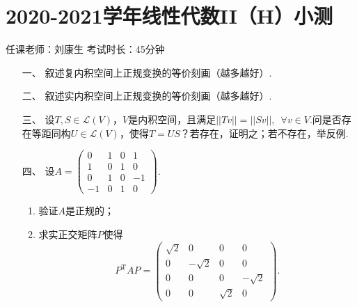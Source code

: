 \section*{2020-2021学年线性代数II（H）小测}

\begin{center}
    任课老师：刘康生\hspace{4em} 考试时长：45分钟
\end{center}

\begin{enumerate}
	\item[一、]叙述复内积空间上正规变换的等价刻画（越多越好）.
	\item[二、]叙述实内积空间上正规变换的等价刻画（越多越好）.
	\item[三、]设$T,S\in\mathcal{L}(V)$，$V$是内积空间，且满足$||Tv||=||Sv||,\enspace \forall v\in V$.问是否存在等距同构$U\in\mathcal{L}(V)$，使得$T=US$？若存在，证明之；若不存在，举反例.
	\item[四、]设$A=\begin{pmatrix}
        0 & 1 & 0 & 1 \\ 1 & 0 & 1 & 0 \\ 0 & 1 & 0 & -1 \\ -1 & 0 & 1 & 0
    \end{pmatrix}$.
    \begin{enumerate}[label=(\arabic*)]
        \item 验证$A$是正规的；
        \item 求实正交矩阵$P$使得
        \[P^{\mathrm{T}}AP=\begin{pmatrix}
            \sqrt{2} & 0 & 0 & 0 \\ 0 & -\sqrt{2} & 0 & 0 \\ 0 & 0 & 0 & -\sqrt{2} \\ 0 & 0 & \sqrt{2} & 0
        \end{pmatrix}.\]
    \end{enumerate}
\end{enumerate}
\newpage
